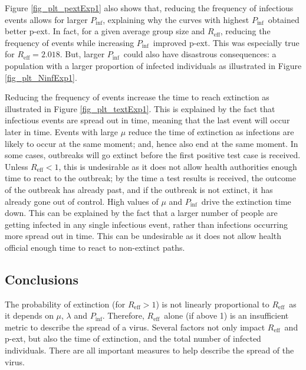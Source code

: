\documentclass[sr]{drdc-report}
\def\Reff{\ensuremath{R_\mathrm{eff}}}
\def\Pinf{\ensuremath{P_\mathrm{inf}}}
\begin{document}
Figure \ref{fig_plt_pextExp1} also shows that, reducing the frequency of infectious events allows for larger \Pinf, explaining why the curves with highest \Pinf\ obtained better p-ext. In fact, for a given average group size and \Reff, reducing the frequency of events while increasing \Pinf\ improved p-ext. This was especially true for $\Reff = 2.018$. But, larger \Pinf\ could also have disastrous consequences: a population with a larger proportion of infected individuals as illustrated in Figure \ref{fig_plt_NinfExp1}.

Reducing the frequency of events increase the time to reach extinction as illustrated in Figure \ref{fig_plt_textExp1}. This is explained by the fact that infectious events are spread out in time, meaning that the last event will occur later in time. Events with large $\mu$ reduce the time of extinction as infections are likely to occur at the same moment; and, hence also end at the same moment. In some cases, outbreaks will go extinct before the first positive test case is received. Unless $\Reff < 1$, this is undesirable as it does not allow health authorities enough time to react to the outbreak; by the time a test results is received, the outcome of the outbreak has already past, and if the outbreak is not extinct, it has already gone out of control. High values of $\mu$ and \Pinf\ drive the extinction time down. This can be explained by the fact that a larger number of people are getting infected in any single infectious event, rather than infections occurring more spread out in time. This can be undesirable as it does not allow health official enough time to react to non-extinct paths. 

\subsection{Conclusions}

The probability of extinction (for $\Reff > 1$) is not linearly proportional to \Reff\ as it depends on $\mu$, $\lambda$ and \Pinf. Therefore, \Reff\ alone (if above 1) is an insufficient metric to describe the spread of a virus. Several factors not only impact \Reff\ and p-ext, but also the time of extinction, and the total number of infected individuals. There are all important measures to help describe the spread of the virus. 
\end{document}
